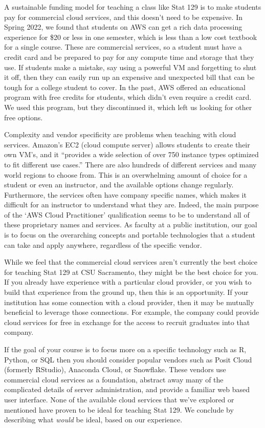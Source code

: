 \documentclass[12pt]{article}
\begin{document}
A sustainable funding model for teaching a class like Stat 129 is to make students pay for commercial cloud services, and this doesn't need to be expensive.
In Spring 2022, we found that students on AWS can get a rich data processing experience for \$20 or less in one semester, which is less than a low cost textbook for a single course.
These are commercial services, so a student must have a credit card and be prepared to pay for any compute time and storage that they use.
If students make a mistake, say using a powerful VM and forgetting to shut it off, then they can easily run up an expensive and unexpected bill that can be tough for a college student to cover.
In the past, AWS offered an educational program with free credits for students, which didn't even require a credit card.
We used this program, but they discontinued it, which left us looking for other free options.

Complexity and vendor specificity are problems when teaching with cloud services.
Amazon's EC2 (cloud compute server) allows students to create their own VM's, and it ``provides a wide selection of over 750 instance types optimized to fit different use cases.''\cite{aws-ec2}
There are also hundreds of different services and many world regions to choose from.
This is an overwhelming amount of choice for a student or even an instructor, and the available options change regularly.
Furthermore, the services often have company specific names, which makes it difficult for an instructor to understand what they are.
Indeed, the main purpose of the `AWS Cloud Practitioner' qualification seems to be to understand all of these proprietary names and services.
As faculty at a public institution, our goal is to focus on the overarching concepts and portable technologies that a student can take and apply anywhere, regardless of the specific vendor.

While we feel that the commercial cloud services aren't currently the best choice for teaching Stat 129 at CSU Sacramento, they might be the best choice for you.
If you already have experience with a particular cloud provider, or you wish to build that experience from the ground up, then this is an opportunity. 
If your institution has some connection with a cloud provider, then it may be mutually beneficial to leverage those connections.
For example, the company could provide cloud services for free in exchange for the access to recruit graduates into that company.

If the goal of your course is to focus more on a specific technology such as R, Python, or SQL then you should consider popular vendors such as Posit Cloud (formerly RStudio), Anaconda Cloud, or Snowflake.
These vendors use commercial cloud services as a foundation, abstract away many of the complicated details of server administration, and provide a familiar web based user interface.
None of the available cloud services that we've explored or mentioned have proven to be ideal for teaching Stat 129.
We conclude by describing what \emph{would} be ideal, based on our experience.
\end{document}
